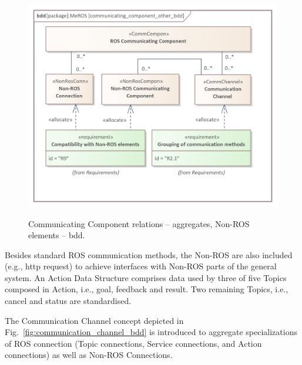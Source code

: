 \documentclass{ieeeaccess}
\begin{document}
	\begin{figure}[htb]
		\centering
		\begin{center}
			{\includegraphics[scale=0.73]{img/meros_pkg/communicating_component_other_bdd.png}}
		\end{center}
		\caption{Communicating Component relations -- aggregates, Non-ROS elements -- bdd.} 
		\label{fig:communicating_component_other_bdd}
	\end{figure}
	
	Besides standard ROS communication methods, the Non-ROS are also included (e.g., http request) to achieve interfaces with Non-ROS parts of the general system. An Action Data Structure comprises data used by three of five Topics composed in Action, i.e., goal, feedback and result. Two remaining Topics, i.e., cancel and status are standardised.
	
	 The Communication Channel \cite{palka2022communication} concept depicted in Fig.~\ref{fig:communication_channel_bdd} is introduced to aggregate specializations of ROS connection (Topic connections, Service connections, and Action connections) as well as Non-ROS Connections. 
	 
\end{document}
